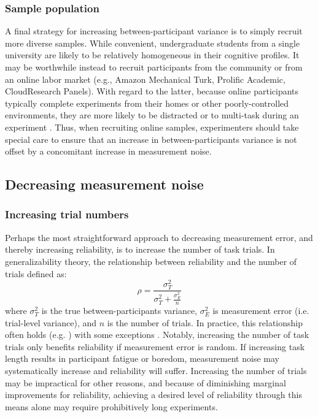 \documentclass[a4paper,12pt]{article}
\begin{document}
\subsubsection{Sample population}

A final strategy for increasing between-participant variance is to simply recruit more diverse samples. While convenient, undergraduate students from a single university are likely to be relatively homogeneous in their cognitive profiles. It may be worthwhile instead to recruit participants from the community or from an online labor market (e.g., Amazon Mechanical Turk, Prolific Academic, CloudResearch Panels). With regard to the latter, because online participants typically complete experiments from their homes or other poorly-controlled environments, they are more likely to be distracted or to multi-task during an experiment \cite{newman2021data}. Thus, when recruiting online samples, experimenters should take special care to ensure that an increase in between-participants variance is not offset by a concomitant increase in measurement noise.

\subsection{Decreasing measurement noise}

\subsubsection{Increasing trial numbers}

Perhaps the most straightforward approach to decreasing measurement error, and thereby increasing reliability, is to increase the number of task trials. In generalizability theory, the relationship between reliability and the number of trials defined as:
\begin{equation}
    \rho = \frac{\sigma^2_T}{\sigma^2_T + \frac{\sigma^2_E}{n}}
\end{equation}
where $\sigma^2_T$ is the true between-participants variance, $\sigma^2_E$ is measurement error (i.e. trial-level variance), and $n$ is the number of trials. In practice, this relationship often holds (e.g. \cite{paap2016role, cooper2017role}) with some exceptions \cite{price2015empirical, klingelhoefer2022robust}. Notably, increasing the number of task trials only benefits reliability if measurement error is random. If increasing task length results in participant fatigue or boredom, measurement noise may systematically increase and reliability will suffer. Increasing the number of trials may be impractical for other reasons, and because of diminishing marginal improvements for reliability, achieving a desired level of reliability through this means alone may require prohibitively long experiments.
\end{document}

